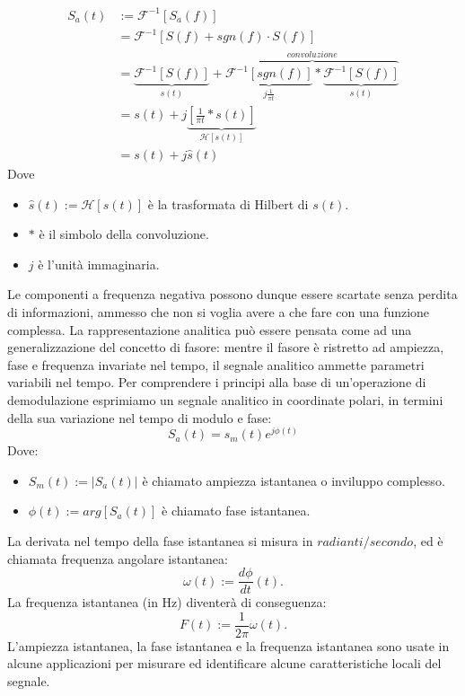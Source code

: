 \documentclass[a4paper, 12pt]{book}
\begin{document}
\begin{align}
	S_a(t)&:= \mathcal{F}^{-1}[S_a(f)] \\
	&= \mathcal{F}^{-1}[S(f)+sgn(f) \cdot S(f)] \\
	&=\underbrace{\mathcal{F}^{-1}[S(f)]}_{s(t)} + \overbrace{ \underbrace{\mathcal{F}			^{-1} [sgn(f)]}_{j\frac{1}{\pi t}} * \underbrace{\mathcal{F}^{-1}[S(f)]}_{s(t)} }			^{convoluzione} \\
	&=s(t)+j \underbrace{[\frac{1}{\pi t}*s(t)]}_{\mathcal{H}[s(t)]} \\
	&=s(t) + j\hat{s}(t)
\end{align}
Dove
\begin{itemize}
	\item $\hat{s}(t):=\mathcal{H}[s(t)]$ è la trasformata di Hilbert di $s(t)$.
	\item $*$ è il simbolo della convoluzione.
	\item $j$ è l’unità immaginaria.
\end{itemize}
Le componenti a frequenza negativa possono dunque essere scartate senza perdita di informazioni, ammesso che non si voglia avere a che fare con una funzione complessa.
La rappresentazione analitica può essere pensata come ad una generalizzazione del concetto di fasore: mentre il fasore è ristretto ad ampiezza, fase e frequenza invariate nel tempo, il segnale analitico ammette parametri variabili nel tempo.
Per comprendere i principi alla base di un'operazione di demodulazione esprimiamo un segnale analitico in coordinate polari, in termini della sua variazione nel tempo di modulo e fase:
\begin{equation}
	S_a(t)=s_m(t)e^{j \phi (t)}
\end{equation}
Dove:
\begin{itemize}
	\item $S_m(t):= |S_a(t)|$ è chiamato ampiezza istantanea o inviluppo complesso.
	\item $\phi (t):= arg[S_a(t)]$ è chiamato fase istantanea.
\end{itemize}
La derivata nel tempo della fase istantanea si misura in $radianti/secondo$, ed è chiamata frequenza angolare istantanea:
\begin{equation}
	\omega (t):= \frac{d \phi}{dt} (t).
\end{equation}
La frequenza istantanea (in Hz) diventerà di conseguenza:
\begin{equation}
	F(t):= \frac{1}{2 \pi} \omega (t).
\end{equation}
L’ampiezza istantanea, la fase istantanea e la frequenza istantanea sono usate in alcune applicazioni per misurare ed identificare alcune caratteristiche locali del segnale.
\newline
\end{document}

